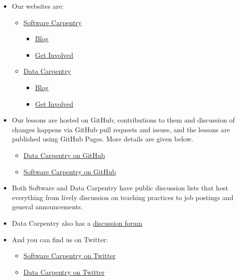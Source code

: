 \begin{itemize}
\item Our websites are:


\begin{itemize}
\item \href{\{\{ site.swc\_site \}\}}{Software Carpentry}


\begin{itemize}
\item \href{\{\{ site.swc\_site \}\}/blog/}{Blog}
\item \href{\{\{ site.swc\_site \}\}/join/}{Get Involved}
\end{itemize}
\item \href{\{\{ site.dc\_site \}\}}{Data Carpentry}


\begin{itemize}
\item \href{\{\{ site.dc\_site \}\}/blog/}{Blog}
\item \href{\{\{ site.dc\_site \}\}/involved/}{Get Involved}
\end{itemize}
\end{itemize}
\item Our lessons are hosted on GitHub;
contributions to them and discussion of changes happens via GitHub pull requests and issues,
and the lessons are published using GitHub Pages.
More details are given below.


\begin{itemize}
\item \href{\{\{ site.dc\_github \}\}}{Data Carpentry on GitHub}
\item \href{\{\{ site.swc\_github \}\}}{Software Carpentry on GitHub}
\end{itemize}
\item Both Software and Data Carpentry have public discussion lists
that host everything from lively discussion on teaching practices
to job postings and general announcements.
\item Data Carpentry also has a \href{http://discuss.datacarpentry.org/}{discussion forum}
\item And you can find us on Twitter:


\begin{itemize}
\item \href{https://twitter.com/swcarpentry}{Software Carpentry on Twitter}
\item \href{https://twitter.com/datacarpentry}{Data Carpentry on Twitter}
\end{itemize}
\end{itemize}

